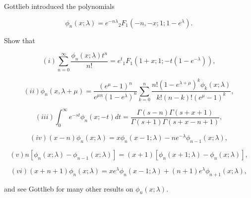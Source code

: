 \begin{problem}\label{problem10chapter18}
Gottlieb introduced the polynomials

$$\phi_n(x;\lambda) = e^{-n\lambda} {}_2F_1(-n, -x;1;1-e^{\lambda}).$$

Show that

$$(i) \displaystyle\sum_{n=0}^{\infty} \dfrac{\phi_n(x;\lambda)t^n}{n!} = e^t {}_1F_1(1+x;1;-t(1-e^{-\lambda})),$$

$$(ii) \phi_n(x,\lambda+\mu) = \dfrac{(e^{\mu}-1)^n}{e^{\mu n}(1 - e^{\lambda})^n} \displaystyle\sum_{k=0}^n \dfrac{n! (1-e^{\lambda + \mu})^k \phi_k(x;\lambda)}{k! (n-k)! (e^{\mu}-1)^k},$$

$$(iii) \displaystyle\int_0^{\infty} e^{-st} \phi_n(x;-t) dt = \dfrac{\Gamma(s-n) \Gamma(s+x+1)}{\Gamma(s+1) \Gamma(s+x-n+1)},$$

$$(iv) (x-n)\phi_n(x;\lambda) = x \phi_n(x-1;\lambda) - ne^{-\lambda} \phi_{n-1}(x;\lambda),$$

$$(v) n[\phi_n(x;\lambda)-\phi_{n-1}(x;\lambda)] = (x+1)[\phi_n(x+1;\lambda) - \phi_n(x;\lambda)],$$

$$(vi) (x+n+1)\phi_n(x;\lambda) = xe^{\lambda}\phi_n(x-1;\lambda) + (n+1)e^{\lambda}\phi_{n+1}(x;\lambda),$$

and see Gottlieb for many other results on $\phi_n(x;\lambda)$.
\end{problem}
